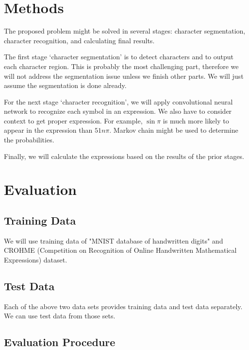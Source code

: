 \documentclass[10pt,twocolumn,letterpaper]{article}
\begin{document}
\section{Methods}

The proposed problem might be solved in several stages:
character segmentation, character recognition, and calculating final results.

The first stage `character segmentation' is to detect characters and to output each character region.
This is probably the most challenging part, therefore we will not address the segmentation issue
unless we finish other parts.
We will just assume the segmentation is done already.

For the next stage `character recognition',
we will apply convolutional neural network to recognize each symbol in an expression.
We also have to consider context to get proper expression. For example, $\sin \pi$ is much more likely to appear in the expression than $51n \pi$. Markov chain might be used to determine the probabilities.

Finally, we will calculate the expressions based on the results of the prior stages.


\section{Evaluation}


\subsection{Training Data}

We will use training data of "MNIST database of handwritten digits"
and CROHME (Competition on Recognition of Online Handwritten Mathematical Expressions) dataset. 

\subsection{Test Data}

Each of the above two data sets provides training data and test data separately.
We can use test data from those sets.

\subsection{Evaluation Procedure}
\end{document}
